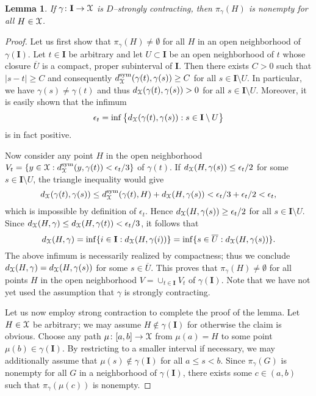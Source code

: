 \documentclass[letterpaper,fleqn]{article}
\theoremstyle{plain}
\newtheorem{lemma}[theorem]{Lemma}
\theoremstyle{definition}
\newcommand{\abs}[1]{\left\vert#1\right\vert}
\newcommand{\os}{{\EuScript X}} %
\newcommand{\dsym}{d^{\mathrm{sym}}_\os} %
\newcommand{\cp}{\pi} %
\newcommand{\I}{\mathbf{I}}
\begin{document}
\begin{lemma}\label{lem:projection_exists}
If $\gamma\colon \I\to \os$ is $D$--strongly contracting, then $\cp_\gamma(H)$ is nonempty for all $H\in\os$.
\end{lemma}
\begin{proof}
Let us first show that $\cp_\gamma(H)\neq\emptyset$ for all $H$ in an open neighborhood of $\gamma(\I)$. 
Let $t\in \I$ be arbitrary and let $U\subset \I$ be an open neighborhood of $t$ whose closure $\overline{U}$ is a compact, proper subinterval of $\I$. Then there exists $C > 0$ such that $\abs{s-t} \ge C$ and consequently $\dsym(\gamma(t),\gamma(s))\ge C$ for all $s\in \I\setminus U$. In particular, we have $\gamma(s)\ne \gamma(t)$ and thus $d_\os(\gamma(t),\gamma(s)) > 0$ for all $s\in \I\setminus U$. Moreover, it is easily shown that the infimum
\[\epsilon_t = \inf\big\{d_\os(\gamma(t),\gamma(s)) : s\in \I\setminus U\big\}\]
is in fact positive. 

Now consider any point $H$ in the open neighborhood $V_t = \{y\in \os : \dsym(y,\gamma(t)) < \epsilon_t/3\}$ of $\gamma(t)$. If $d_\os(H,\gamma(s))\le\epsilon_t/2$ for some $s\in \I\setminus U$, the triangle inequality would give
\[d_\os(\gamma(t),\gamma(s)) \le \dsym(\gamma(t),H) + d_\os(H,\gamma(s)) < \epsilon_t/3 + \epsilon_t/2 <  \epsilon_t,\]
which is impossible by definition of $\epsilon_t$. Hence $d_\os(H,\gamma(s))\ge \epsilon_t/2$ for all $s\in \I\setminus U$. Since $d_\os(H,\gamma)\le d_\os(H,\gamma(t)) < \epsilon_t/3$, it follows that 
\[d_\os(H,\gamma) = \inf\{i\in \I : d_\os(H,\gamma(i))\} = \inf\{s\in \overline{U} : d_\os(H,\gamma(s))\}.\]
The above infimum is necessarily realized by compactness; thus we conclude $d_\os(H,\gamma) = d_\os(H,\gamma(s))$ for some $s\in \overline{U}$. This proves that $\cp_\gamma(H)\neq\emptyset$ for all points $H$ in the open neighborhood $V = \cup_{t\in\I} V_t$ of $\gamma(\I)$. Note that we have not yet used the assumption that $\gamma$ is strongly contracting.

Let us now employ strong contraction to complete the proof of the lemma. Let $H\in \os$ be arbitrary; we may assume $H\notin \gamma(\I)$ for otherwise the claim is obvious. Choose any path $\mu\colon [a,b]\to\os$ from $\mu(a)=H$ to some point $\mu(b)\in \gamma(\I)$. By restricting to a smaller interval if necessary, we may additionally assume that $\mu(s)\notin \gamma(\I)$ for all $a \le s < b$. Since $\cp_\gamma(G)$ is nonempty for all $G$ in a neighborhood of $\gamma(\I)$, there exists some $c \in (a,b)$ such that $\cp_\gamma(\mu(c))$ is nonempty.


\end{proof}
\end{document}
